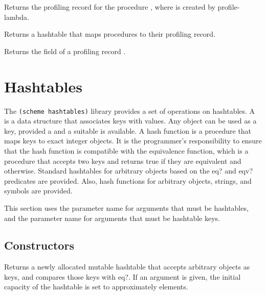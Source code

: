 \begin{entry}{%
}
Returns the profiling record for the procedure , where  is created by {\cf profile-lambda}. 
\end{entry}

\begin{entry}{%
}
Returns a hashtable that maps procedures to their profiling record. 
\end{entry}

\begin{entry}{%
}
Returns the field of a profiling record . 
\end{entry}

\section{Hashtables}
\label{hashtablesection}

The {\tt (scheme hashtables)} library provides a set of operations on
hashtables.
A  is a data structure that associates keys with values.
Any object can be used as a key, provided a 
and a suitable  is available.  A hash function is a
procedure that maps
keys to exact integer objects.
It is the programmer's responsibility to ensure that the hash function
is compatible with the equivalence function,
which is a procedure that accepts two keys and returns true if they
are equivalent and \schfalse{} otherwise.
Standard hashtables for arbitrary objects based on the {\cf eq?} and 
{\cf eqv?} predicates are provided.  
Also, hash functions for arbitrary objects, strings, and symbols are provided.

This section uses the  parameter name for arguments
that must be hashtables, and the  parameter name for
arguments that must be hashtable keys.

\subsection{Constructors}


\begin{entry}{%
}

Returns a newly allocated mutable hashtable that accepts
arbitrary objects as keys,
and compares those keys with {\cf eq?}. If an argument is given, the initial 
capacity of the hashtable is set to approximately  elements.

\end{entry}

